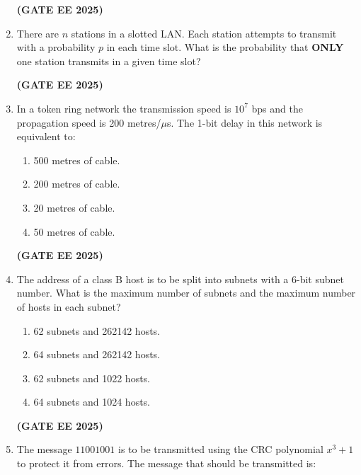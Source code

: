 \documentclass[journal,12pt,onecolumn]{IEEEtran}
\theoremstyle{remark}
\begin{document}
\begin{enumerate}
    \hfill \textbf{(GATE EE 2025)}
    \item There are $n$ stations in a slotted LAN. Each station attempts to transmit with a probability $p$ in each time slot. What is the probability that \textbf{ONLY} one station transmits in a given time slot?  
    \begin{enumerate}
    \end{enumerate}
\hfill \textbf{(GATE EE 2025)}
    \item In a token ring network the transmission speed is $10^{7}$ bps and the propagation speed is 200 metres/$\mu$s. The 1-bit delay in this network is equivalent to:  
    \begin{enumerate}
        \item 500 metres of cable.
        \item 200 metres of cable.
        \item 20 metres of cable.
        \item 50 metres of cable.
    \end{enumerate}
\hfill \textbf{(GATE EE 2025)}
    \item The address of a class B host is to be split into subnets with a 6-bit subnet number. What is the maximum number of subnets and the maximum number of hosts in each subnet?  
    \begin{enumerate}
        \item 62 subnets and 262142 hosts.
        \item 64 subnets and 262142 hosts.
        \item 62 subnets and 1022 hosts.
        \item 64 subnets and 1024 hosts.
    \end{enumerate}
\hfill \textbf{(GATE EE 2025)}
    \item The message $11001001$ is to be transmitted using the CRC polynomial $x^3 + 1$ to protect it from errors. The message that should be transmitted is:  
    \begin{enumerate}
\end{enumerate}
\end{enumerate}
\end{document}
